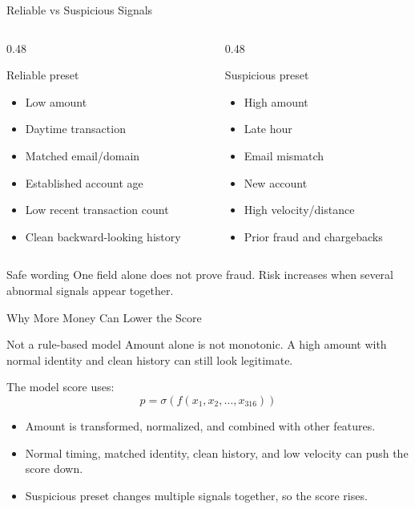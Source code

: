 \documentclass[aspectratio=169,10pt]{beamer}
\begin{document}
\begin{frame}{Reliable vs Suspicious Signals}
  \begin{columns}[T]
    \begin{column}{0.48\textwidth}
      \begin{block}{Reliable preset}
        \begin{itemize}
          \item Low amount
          \item Daytime transaction
          \item Matched email/domain
          \item Established account age
          \item Low recent transaction count
          \item Clean backward-looking history
        \end{itemize}
      \end{block}
    \end{column}
    \begin{column}{0.48\textwidth}
      \begin{alertblock}{Suspicious preset}
        \begin{itemize}
          \item High amount
          \item Late hour
          \item Email mismatch
          \item New account
          \item High velocity/distance
          \item Prior fraud and chargebacks
        \end{itemize}
      \end{alertblock}
    \end{column}
  \end{columns}
  \begin{block}{Safe wording}
    One field alone does not prove fraud. Risk increases when several abnormal signals appear together.
  \end{block}
\end{frame}

\begin{frame}{Why More Money Can Lower the Score}
  \begin{block}{Not a rule-based model}
    Amount alone is not monotonic. A high amount with normal identity and clean history can still look legitimate.
  \end{block}
  The model score uses:
  \[
    p = \sigma(f(x_1,x_2,\ldots,x_{316}))
  \]
  \begin{itemize}
    \item Amount is transformed, normalized, and combined with other features.
    \item Normal timing, matched identity, clean history, and low velocity can push the score down.
    \item Suspicious preset changes multiple signals together, so the score rises.
  \end{itemize}
\end{frame}
\end{document}
